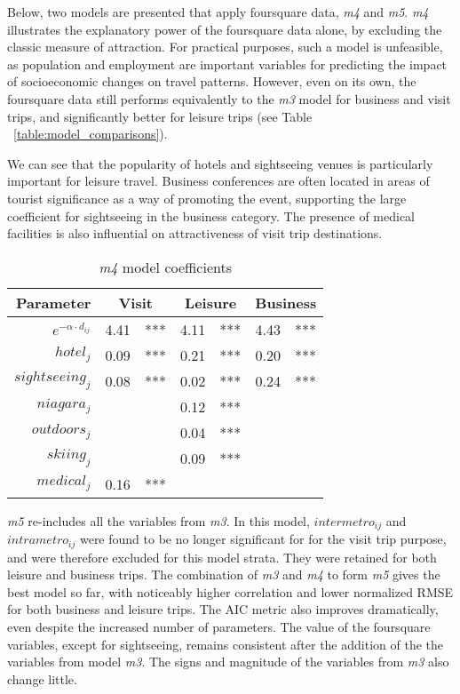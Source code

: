 Below, two models are presented that apply foursquare data, \textit{m4} and \textit{m5}. \textit{m4} illustrates the explanatory power of the foursquare data alone, by excluding the classic measure of attraction. For practical purposes, such a model is unfeasible, as population and employment are important variables for predicting the impact of socioeconomic changes on travel patterns. However, even on its own, the foursquare data still performs equivalently to the \textit{m3} model for business and visit trips, and significantly better for leisure trips (see Table ~\ref{table:model_comparisons}).

We can see that the popularity of hotels and sightseeing venues is particularly important for leisure travel. Business conferences are often located in areas of tourist significance as a way of promoting the event, supporting the large coefficient for sightseeing in the business category. The presence of medical facilities is also influential on attractiveness of visit trip destinations. 


\begin{table}[H]
\centering
\caption{\textit{m4} model coefficients}
\label{table:m4-coeff}
\begin{tabular}{@{}rrlrlrl@{}}
  \toprule
 Parameter & \multicolumn{2}{c}{Visit} & \multicolumn{2}{c}{Leisure} & \multicolumn{2}{c}{Business} \\ \midrule
  $e^{-\alpha  \cdot d_{ij}}$  & 4.41 & *** & 4.11 & *** & 4.43 & *** \\ 
  $hotel_j$ & 0.09 & *** & 0.21 & *** & 0.20 & *** \\ 
  $sightseeing_j$ & 0.08 & *** & 0.02 & *** & 0.24 & *** \\ 
  $niagara_j$  &  &  & 0.12 & *** &  &  \\ 
  $outdoors_j$  &  &  & 0.04 & *** &  &  \\ 
  $skiing_j$   &  &  & 0.09 & *** &  &  \\ 
  $medical_j$  & 0.16 & *** &  &  &  &  \\ 
   \bottomrule
\end{tabular}
\end{table}

\textit{m5} re-includes all the variables from \textit{m3}. In this model, $intermetro_{ij}$ and $intrametro_{ij}$ were found to be no longer significant for for the visit trip purpose, and were therefore excluded for this model strata. They were retained for both leisure and business trips. The combination of \textit{m3} and \textit{m4} to form \textit{m5} gives the best model so far, with noticeably higher correlation and lower normalized RMSE for both business and leisure trips. The AIC metric also improves dramatically, even despite the increased number of parameters. The value of the foursquare variables, except for sightseeing, remains consistent after the addition of the the variables from model \textit{m3}. The signs and magnitude of the variables from \textit{m3} also change little.

